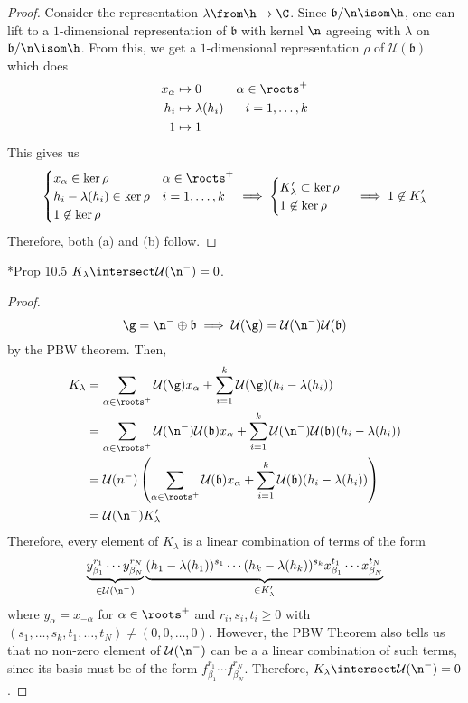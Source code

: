 \documentclass[11pt,leqno,oneside]{amsart}
\numberwithin{thm}{section}
\newcommand{\U}{\mathcal{U}}
\renewcommand{\b}{\mathfrak{b}}
\begin{document}
\begin{proof}
    Consider the representation \(\lambda \from \h \to \C\). Since
    \(\b/\n \isom \h\), one can lift to a \(1\)-dimensional
    representation of \(\b\) with kernel \(\n\) agreeing with
    \(\lambda\) on \(\b/\n \isom \h\). From this, we get a
    \(1\)-dimensional representation \(\rho\) of \(\U(\b)\) which does
    \begin{align*}
      x_\alpha & \mapsto 0 & \alpha \in \roots^+\\
      h_i & \mapsto \lambda(h_i) & i = 1, \ldots, k\\
      1 & \mapsto 1
    \end{align*}
    This gives us \[
      \begin{cases}
        x_\alpha \in \ker \rho & \alpha \in \roots^+\\
        h_i-\lambda(h_i) \in \ker \rho & i = 1,\ldots,k\\
        1 \not \in \ker \rho
      \end{cases} \implies
      \begin{cases}
        K_\lambda' \subset \ker \rho \\
        1 \not \in \ker \rho
      \end{cases} \implies 1 \not \in K_\lambda'
    \]
    Therefore, both (a) and (b) follow.
  \end{proof}
  \begin{prop}
    \cite{carter}*{Prop 10.5} \(K_\lambda \intersect \U(\n^-) = 0\).
  \end{prop}
  \begin{proof}
    \[
      \g = \n^- \oplus \b \implies \U(\g) = \U(\n^-)\U(\b)
    \]
    by the PBW theorem. Then,
    \begin{align*}
      K_\lambda
      & = \sum_{\alpha \in \roots^+} \U(\g) x_\alpha + \sum_{i=1}^k
        \U(\g)(h_i - \lambda(h_i)) \\
      & = \sum_{\alpha \in \roots^+} \U(\n^-) \U(\b) x_\alpha +
        \sum_{i=1}^k \U(\n^-) \U(\b)(h_i - \lambda(h_i)) \\
      & = \U(n^-)\left(\sum_{\alpha \in \roots^+} \U(\b)
        x_\alpha +  \sum_{i=1}^k \U(\b)(h_i - \lambda(h_i))
        \right) \\
      & = \U(\n^-)K_\lambda'
    \end{align*}
    Therefore, every element of \(K_\lambda\) is a linear combination
    of terms of the form \[
      \underbrace{y_{\beta_1}^{r_1} \cdots y_{\beta_N}^{r_N}}_{\in \U(\n^-)}
      \underbrace{(h_1-\lambda(h_1))^{s_1} \cdots (h_k-\lambda(h_k)) ^{s_k}
      x_{\beta_1}^{t_1} \cdots x_{\beta_N}^{t_N}}_{\in K_{\lambda}'}
  \]
  where \(y_\alpha = x_{-\alpha}\) for \(\alpha \in \roots^+\) and
  \(r_i, s_i, t_i \geq 0\) with \((s_1, \ldots, s_k, t_1, \ldots, t_N)
  \neq (0,0,\ldots,0)\). However, the PBW Theorem also tells us that
  no non-zero element of \(\U(\n^-)\) can be a a linear combination of
  such terms, since its basis must be of the form \(f_{\beta_1}^{r_1}
  \cdots f_{\beta_N}^{r_N}\). Therefore, \(K_\lambda \intersect
  \U(\n^-) = 0\).
\end{proof}
\end{document}
